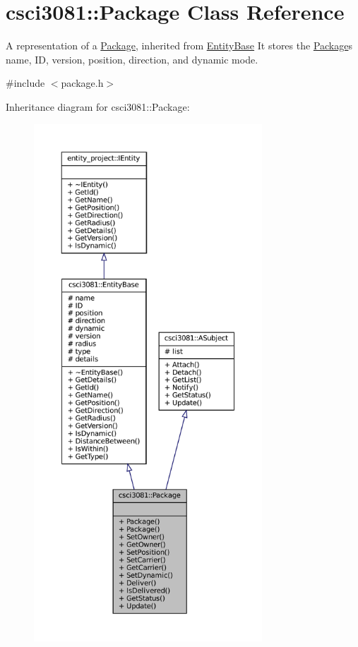 \hypertarget{classcsci3081_1_1Package}{}\section{csci3081\+:\+:Package Class Reference}
\label{classcsci3081_1_1Package}


A representation of a \hyperlink{classcsci3081_1_1Package}{Package}, inherited from \hyperlink{classcsci3081_1_1EntityBase}{Entity\+Base} It stores the \hyperlink{classcsci3081_1_1Package}{Package}\textquotesingle{}s name, ID, version, position, direction, and dynamic mode.  




{\ttfamily \#include $<$package.\+h$>$}



Inheritance diagram for csci3081\+:\+:Package\+:
\nopagebreak
\begin{figure}[H]
\begin{center}
\leavevmode
\includegraphics[height=550pt]{classcsci3081_1_1Package__inherit__graph}
\end{center}
\end{figure}
